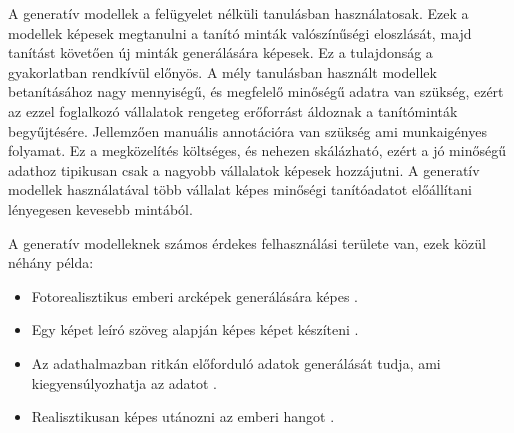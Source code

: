 A generatív modellek a felügyelet nélküli tanulásban használatosak. Ezek a modellek képesek megtanulni a tanító minták valószínűségi eloszlását, majd tanítást követően új minták generálására képesek. Ez a tulajdonság a gyakorlatban rendkívül előnyös. A mély tanulásban használt modellek betanításához nagy mennyiségű, és megfelelő minőségű adatra van szükség, ezért az ezzel foglalkozó vállalatok rengeteg erőforrást áldoznak a tanítóminták begyűjtésére. Jellemzően manuális annotációra van szükség ami munkaigényes folyamat. Ez a megközelítés költséges, és nehezen skálázható, ezért a jó minőségű adathoz tipikusan csak a nagyobb vállalatok képesek hozzájutni. A generatív modellek használatával több vállalat képes minőségi tanítóadatot előállítani lényegesen kevesebb mintából.

A generatív modelleknek számos érdekes felhasználási területe van, ezek közül néhány példa:
\begin{itemize} 
	\item Fotorealisztikus emberi arcképek generálására képes \cite{stylegan3}.
	\item Egy képet leíró szöveg alapján képes képet készíteni \cite{reed2016generative}.
	\item Az adathalmazban ritkán előforduló adatok generálását tudja, ami kiegyensúlyozhatja az adatot \cite{sampath2021survey}.
	\item Realisztikusan képes utánozni az emberi hangot \cite{jia2018transfer}.
\end{itemize}




